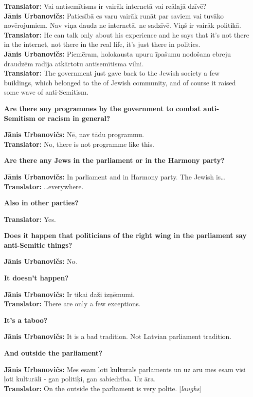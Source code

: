 \textbf{Translator:} Vai antisemītisms ir vairāk internetā vai reālajā dzīvē?\\ 
\textbf{Jānis Urbanovičs:} Patiesībā es varu vairāk runāt par saviem vai tuvāko novērojumiem. Nav viņa daudz ne internetā, ne sadzīvē. Viņš ir vairāk politikā. \\
\textbf{Translator:} He can talk only about his experience and he says that it's not there in the internet, not there in the real life, it’s just there in politics.\\ 
\textbf{Jānis Urbanovičs:} Piemēram, holokausta upuru īpašumu nodošana ebreju draudzēm radīja atkārtotu antisemītisma vilni.\\
\textbf{Translator:} The government just gave back to the Jewish society a few buildings, which belonged to the of Jewish community, and of course it raised some wave of anti-Semitism.  

\textbf{Are there any programmes by the government to combat anti-Semitism or racism in general?}  

\textbf{Jānis Urbanovičs:} Nē, nav tādu programmu.\\
\textbf{Translator:} No, there is not programme like this.

\textbf{Are there any Jews in the parliament or in the Harmony party?}  

\textbf{Jānis Urbanovičs:} In parliament and in Harmony party. The Jewish is… 
\textbf{Translator:} …everywhere. 

\textbf{Also in other parties?}  

\textbf{Translator:} Yes. 

\textbf{Does it happen that politicians of the right wing in the parliament say anti-Semitic things?}  

\textbf{Jānis Urbanovičs:} No.  

\textbf{It doesn't happen?} 

\textbf{Jānis Urbanovičs:} Ir tikai daži izņēmumi.\\  
\textbf{Translator:} There are only a few exceptions.  

\textbf{It's a taboo?} 

\textbf{Jānis Urbanovičs:} It is a bad tradition. Not Latvian parliament tradition. 

\textbf{And outside the parliament?}  

\textbf{Jānis Urbanovičs:} Mēs esam ļoti kulturāls parlaments un uz āru mēs esam visi ļoti kulturāli - gan politiķi, gan sabiedrība. Uz āra.\\  
\textbf{Translator:} On the outside the parliament is very polite. [\textit{laughs}] 

